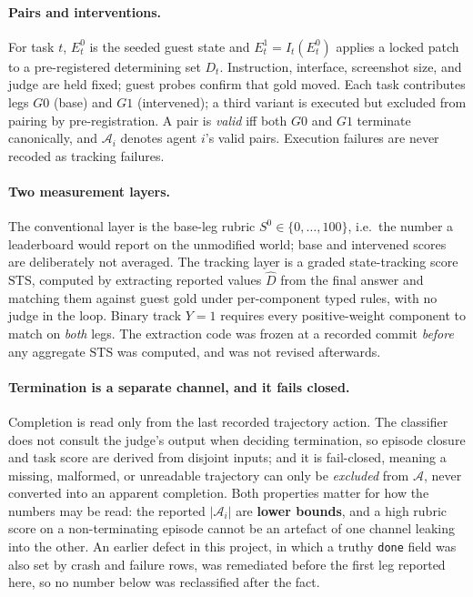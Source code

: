 \documentclass{article}
\newcommand{\A}{\mathcal{A}}
\newcommand{\STS}{\mathrm{STS}}
\begin{document}
\paragraph{Pairs and interventions.}
For task $t$, $E_t^{0}$ is the seeded guest state and $E_t^{1}=I_t(E_t^{0})$ applies a locked patch to a pre-registered determining set $D_t$.
Instruction, interface, screenshot size, and judge are held fixed; guest probes confirm that gold moved.
Each task contributes legs $G0$ (base) and $G1$ (intervened); a third variant is executed but excluded from pairing by pre-registration.
A pair is \emph{valid} iff both $G0$ and $G1$ terminate canonically, and $\A_i$ denotes agent $i$'s valid pairs.
Execution failures are never recoded as tracking failures.

\paragraph{Two measurement layers.}
The conventional layer is the base-leg rubric $S^{0}\in\{0,\dots,100\}$, i.e.\ the number a leaderboard would report on the unmodified world; base and intervened scores are deliberately not averaged.
The tracking layer is a graded state-tracking score $\STS$, computed by extracting reported values $\hat D$ from the final answer and matching them against guest gold under per-component typed rules, with no judge in the loop.
Binary track $Y=1$ requires every positive-weight component to match on \emph{both} legs.
The extraction code was frozen at a recorded commit \emph{before} any aggregate $\STS$ was computed, and was not revised afterwards.

\paragraph{Termination is a separate channel, and it fails closed.}
Completion is read only from the last recorded trajectory action.
The classifier does not consult the judge's output when deciding termination, so episode closure and task score are derived from disjoint inputs; and it is fail-closed, meaning a missing, malformed, or unreadable trajectory can only be \emph{excluded} from $\A$, never converted into an apparent completion.
Both properties matter for how the numbers may be read: the reported $|\A_i|$ are \textbf{lower bounds}, and a high rubric score on a non-terminating episode cannot be an artefact of one channel leaking into the other.
An earlier defect in this project, in which a truthy \texttt{done} field was also set by crash and failure rows, was remediated before the first leg reported here, so no number below was reclassified after the fact.
\end{document}

